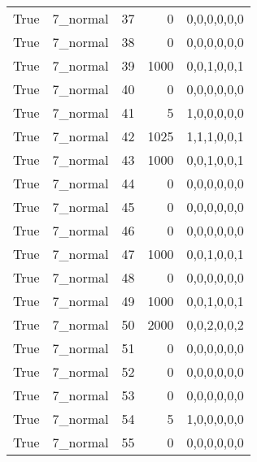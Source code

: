 \begin{tabular}{llrrl}
 True            & 7\_normal            &            37 &                     0 & 0,0,0,0,0,0   \\
 True            & 7\_normal            &            38 &                     0 & 0,0,0,0,0,0   \\
 True            & 7\_normal            &            39 &                  1000 & 0,0,1,0,0,1   \\
 True            & 7\_normal            &            40 &                     0 & 0,0,0,0,0,0   \\
 True            & 7\_normal            &            41 &                     5 & 1,0,0,0,0,0   \\
 True            & 7\_normal            &            42 &                  1025 & 1,1,1,0,0,1   \\
 True            & 7\_normal            &            43 &                  1000 & 0,0,1,0,0,1   \\
 True            & 7\_normal            &            44 &                     0 & 0,0,0,0,0,0   \\
 True            & 7\_normal            &            45 &                     0 & 0,0,0,0,0,0   \\
 True            & 7\_normal            &            46 &                     0 & 0,0,0,0,0,0   \\
 True            & 7\_normal            &            47 &                  1000 & 0,0,1,0,0,1   \\
 True            & 7\_normal            &            48 &                     0 & 0,0,0,0,0,0   \\
 True            & 7\_normal            &            49 &                  1000 & 0,0,1,0,0,1   \\
 True            & 7\_normal            &            50 &                  2000 & 0,0,2,0,0,2   \\
 True            & 7\_normal            &            51 &                     0 & 0,0,0,0,0,0   \\
 True            & 7\_normal            &            52 &                     0 & 0,0,0,0,0,0   \\
 True            & 7\_normal            &            53 &                     0 & 0,0,0,0,0,0   \\
 True            & 7\_normal            &            54 &                     5 & 1,0,0,0,0,0   \\
 True            & 7\_normal            &            55 &                     0 & 0,0,0,0,0,0   \\

\end{tabular}
